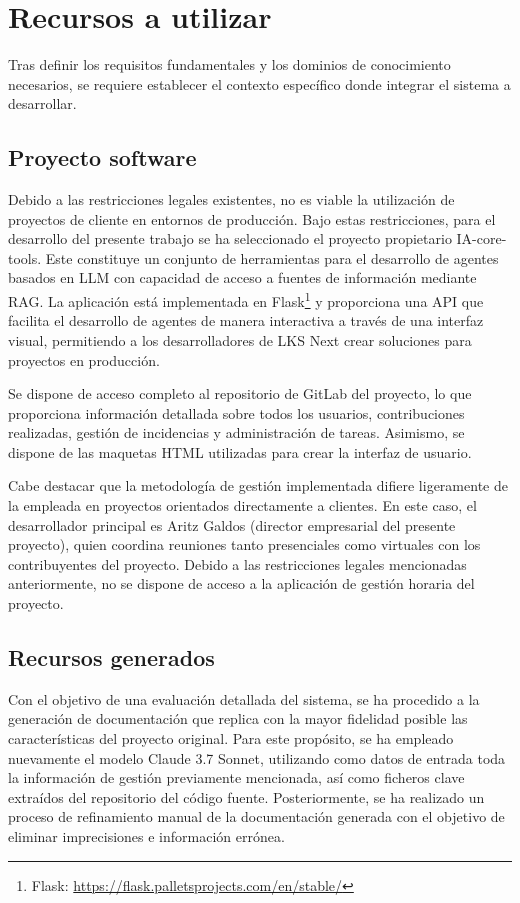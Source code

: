 \section{Recursos a utilizar}
Tras definir los requisitos fundamentales y los dominios de conocimiento necesarios, se requiere establecer el contexto específico donde integrar el sistema a desarrollar. 
\subsection{Proyecto software}

Debido a las restricciones legales existentes, no es viable la utilización de proyectos de cliente en entornos de producción. Bajo estas restricciones, para el desarrollo del presente trabajo se ha seleccionado el proyecto propietario IA-core-tools. Este constituye un conjunto de herramientas para el desarrollo de agentes basados en LLM con capacidad de acceso a fuentes de información mediante RAG. La aplicación está implementada en Flask\footnote{Flask: \url{https://flask.palletsprojects.com/en/stable/}} y proporciona una API que facilita el desarrollo de agentes de manera interactiva a través de una interfaz visual, permitiendo a los desarrolladores de LKS Next crear soluciones para proyectos en producción.

Se dispone de acceso completo al repositorio de GitLab del proyecto, lo que proporciona información detallada sobre todos los usuarios, contribuciones realizadas, gestión de incidencias y administración de tareas. Asimismo, se dispone de las maquetas HTML utilizadas para crear la interfaz de usuario. 

Cabe destacar que la metodología de gestión implementada difiere ligeramente de la empleada en proyectos orientados directamente a clientes. En este caso, el desarrollador principal es Aritz Galdos (director empresarial del presente proyecto), quien coordina reuniones tanto presenciales como virtuales con los contribuyentes del proyecto. Debido a las restricciones legales mencionadas anteriormente, no se dispone de acceso a la aplicación de gestión horaria del proyecto.

\subsection{Recursos generados}
Con el objetivo de una evaluación detallada del sistema, se ha procedido a la generación de documentación que replica con la mayor fidelidad posible las características del proyecto original. Para este propósito, se ha empleado nuevamente el modelo Claude 3.7 Sonnet, utilizando como datos de entrada toda la información de gestión previamente mencionada, así como ficheros clave extraídos del repositorio del código fuente. Posteriormente, se ha realizado un proceso de refinamiento manual de la documentación generada con el objetivo de eliminar imprecisiones e información errónea.

